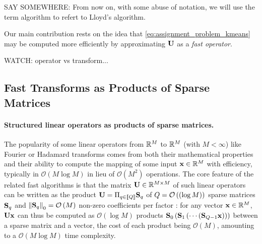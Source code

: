 SAY SOMEWHERE: From now on, with some abuse of notation, we will use the term
\kmeans algorithm to refert to Lloyd's algorithm. 

Our main contribution rests on the idea that \eqref{eq:assignment_problem_kmeans} may be computed more efficiently by approximating ${\mathbf{U}}$ as a {\em fast operator}.

WATCH: operator vs transform... 

\subsection{Fast Transforms as Products of Sparse Matrices}
\label{sec:palm4msa}

\paragraph{Structured linear operators as products of sparse matrices.}
The popularity of some linear operators from $\mathbb{R}^{M}$ to $\mathbb{R}^{M}$ (with $M<\infty$)
 like Fourier or Hadamard transforms comes from both their mathematical 
 properties and their ability to compute the mapping of some input ${\mathbf{x}}\in\mathbb{R}^M$ with efficiency, typically in $\mathcal{O}\left (M\log M\right )$ in lieu of  
  $\mathcal{O}\left (M^2\right)$ operations.
The core feature of the related fast algorithms is that the matrix ${\mathbf{U}}\in{\mathbb{R}}^{M\times M}$ of such 
linear operators can be written as the product ${\mathbf{U}}=\Pi_{q\in\left \llbracket Q\right \rrbracket}{\mathbf{S}}_q$ 
of $Q=\mathcal{O}\left(\left( \log M \right)\right)$ sparse 
matrices ${\mathbf{S}}_q$ and $\left \|{\mathbf{S}}_q\right \|_0=\mathcal{O}\left( M \right)$ non-zero 
coefficients per factor \cite{LeMagoarou2016Flexible,Morgenstern1975Linear}:
for any vector ${\mathbf{x}}\in{\mathbb{R}}^M$, ${\mathbf{U}}{\mathbf{x}}$ can thus be computed as $\mathcal{O}\left (\log M\right )$ products ${\mathbf{S}}_0 \left ({\mathbf{S}}_1 \left (\cdots \left ({\mathbf{S}}_{Q-1}{\mathbf{x}}\right )\right )\right )$ between a sparse matrix and a vector, the cost of each product being $\mathcal{O}\left (M\right )$, amounting to a $\mathcal{O}(M \log M)$ time complexity.

